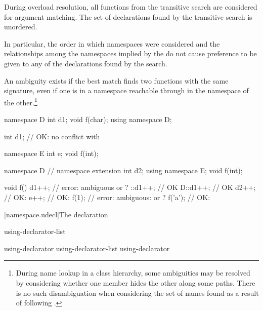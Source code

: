 \pnum
{}%
During overload resolution, all functions from the transitive search are
considered for argument matching. The set of declarations found by the
transitive search is unordered.
\begin{note}
In particular, the order in which namespaces were considered and the
relationships among the namespaces implied by the
 do not cause preference to be given to any
of the declarations found by the search.
\end{note}
An ambiguity exists if the best match finds two functions with the same
signature, even if one is in a namespace reachable through
 in the namespace of the other.\footnote{During
name lookup in a class hierarchy, some ambiguities may be
resolved by considering whether one member hides the other along some
paths. There is no such disambiguation when
considering the set of names found as a result of following
.}
\begin{example}

\begin{codeblock}
namespace D {
  int d1;
  void f(char);
}
using namespace D;

int d1;             // OK: no conflict with 

namespace E {
  int e;
  void f(int);
}

namespace D {       // namespace extension
  int d2;
  using namespace E;
  void f(int);
}

void f() {
  d1++;             // error: ambiguous  or ?
  ::d1++;           // OK
  D::d1++;          // OK
  d2++;             // OK: 
  e++;              // OK: 
  f(1);             // error: ambiguous:  or ?
  f('a');           // OK: 
}
\end{codeblock}
\end{example}%
%

[namespace.udecl]{The  declaration}%

\begin{bnf}
\br
     using-declarator-list \terminal{;}
\end{bnf}

\begin{bnf}
\br
    using-declarator \br
    using-declarator-list \terminal{,} using-declarator 
\end{bnf}

